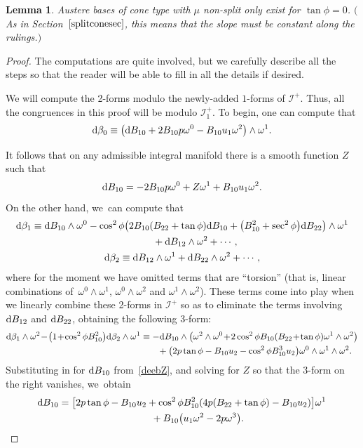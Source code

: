 \documentclass[10pt,a4paper]{amsart}
\def\calI{\mathcal{I}}
\def\w{\omega}
\newtheorem{Lemma}[Theorem]{Lemma}
\numberwithin{equation}{section}
\begin{document}
\begin{Lemma} \label{coneconstant}
Austere bases of cone type with $\mu$ non-split only exist for $\tan\phi = 0$. $($As in Section~$\ref{splitconesec}$, this means that the slope must be constant along the rulings.$)$
\end{Lemma}
\begin{proof}
The computations are quite involved, but we carefully describe all the steps so that the reader will be able to fill in all the details if desired.

We will compute the 2-forms modulo the newly-added $1$-forms of $\calI^+$. Thus, all the congruences in this proof will be modulo $\calI^+_1$. To begin, one can compute that
\begin{gather*}
{\rm d}\beta_0 \equiv \big({\rm d}B_{10} +2B_{10} p \w^0 -B_{10} u_1 \w^2 \big) \wedge \w^1.
\end{gather*}

It follows that on any admissible integral manifold there is a smooth function $Z$ such that
\begin{gather} \label{deebZ}
{\rm d}B_{10} = -2B_{10} p \w^0+Z \w^1 +B_{10} u_1 \w^2.
\end{gather}
On the other hand, we~can compute that
\begin{gather*}
{\rm d}\beta_1 \equiv {\rm d}B_{10} \wedge \w^0 -\cos^2\phi \big( 2B_{10} (B_{22}+\tan\phi) {\rm d}B_{10} + \big(B_{10}^2 + \sec^2\phi\big) {\rm d}B_{22}\big) \wedge \w^1
\\ \hphantom{{\rm d}\beta_1 \equiv}
{} + {\rm d}B_{12}\wedge \w^2 + \cdots,
 \\
{\rm d}\beta_2 \equiv {\rm d}B_{12} \wedge \w^1 + {\rm d}B_{22}\wedge \w^2 + \cdots,
\end{gather*}
where for the moment we have omitted terms that are ``torsion'' (that is, linear combinations of~$\w^0 \wedge \w^1$, $\w^0 \wedge \w^2$ and $\w^1 \wedge \w^2$). These terms come into play when we linearly combine these 2-forms in $\calI^+$ so as to eliminate the terms involving ${\rm d}B_{12}$ and ${\rm d}B_{22}$, obtaining the following 3-form:
\begin{gather*}
{\rm d}\beta_1 \wedge \w^2 \!-\!\big(1\!+\!\cos^2\phi B_{10}^2\big) {\rm d}\beta_2 \wedge \w^1
\equiv -{\rm d}B_{10} \wedge \big( \w^2 \wedge \w^0\! +\! 2\cos^2\phi B_{10}(B_{22}\!+\!\tan\phi) \w^1 \wedge \w^2\big)
\\ \hphantom{{\rm d}\beta_1 \wedge \w^2 \!-\!\big(1\!+\!\cos^2\phi B_{10}^2\big) {\rm d}\beta_2 \wedge \w^1
\equiv\,}
{} + \big( 2p\tan\phi -B_{10} u_2 -\cos^2\phi B_{10}^3 u_2\big) \w^0 \wedge \w^1 \wedge \w^2.
\end{gather*}
Substituting in for ${\rm d}B_{10}$ from~\eqref{deebZ}, and solving for $Z$ so that the 3-form on the right vanishes, we~obtain
\begin{gather}
{\rm d}B_{10} = \big[ 2p\tan\phi - B_{10} u_2 + \cos^2\phi B_{10}^2 (4p(B_{22} + \tan\phi) - B_{10} u_2)\big] \w^1 \nonumber\\
\hphantom{{\rm d}B_{10} =}{} + B_{10} \big(u_1 \w^2 - 2 p \w^3\big). \label{deeb}
\end{gather}


\end{proof}
\end{document}
